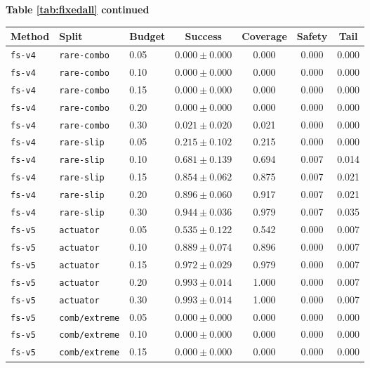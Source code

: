 \documentclass{article}
\begin{document}
\begin{center}
\textbf{Table \ref{tab:fixedall} continued}\\[0.4ex]
\begin{tabular}{lllcccc}
\toprule
Method & Split & Budget & Success & Coverage & Safety & Tail \\
\midrule
\texttt{fs-v4} & \texttt{rare-combo} & 0.05 & $0.000 \pm 0.000$ & 0.000 & 0.000 & 0.000 \\
\texttt{fs-v4} & \texttt{rare-combo} & 0.10 & $0.000 \pm 0.000$ & 0.000 & 0.000 & 0.000 \\
\texttt{fs-v4} & \texttt{rare-combo} & 0.15 & $0.000 \pm 0.000$ & 0.000 & 0.000 & 0.000 \\
\texttt{fs-v4} & \texttt{rare-combo} & 0.20 & $0.000 \pm 0.000$ & 0.000 & 0.000 & 0.000 \\
\texttt{fs-v4} & \texttt{rare-combo} & 0.30 & $0.021 \pm 0.020$ & 0.021 & 0.000 & 0.000 \\
\texttt{fs-v4} & \texttt{rare-slip} & 0.05 & $0.215 \pm 0.102$ & 0.215 & 0.000 & 0.000 \\
\texttt{fs-v4} & \texttt{rare-slip} & 0.10 & $0.681 \pm 0.139$ & 0.694 & 0.007 & 0.014 \\
\texttt{fs-v4} & \texttt{rare-slip} & 0.15 & $0.854 \pm 0.062$ & 0.875 & 0.007 & 0.021 \\
\texttt{fs-v4} & \texttt{rare-slip} & 0.20 & $0.896 \pm 0.060$ & 0.917 & 0.007 & 0.021 \\
\texttt{fs-v4} & \texttt{rare-slip} & 0.30 & $0.944 \pm 0.036$ & 0.979 & 0.007 & 0.035 \\
\texttt{fs-v5} & \texttt{actuator} & 0.05 & $0.535 \pm 0.122$ & 0.542 & 0.000 & 0.007 \\
\texttt{fs-v5} & \texttt{actuator} & 0.10 & $0.889 \pm 0.074$ & 0.896 & 0.000 & 0.007 \\
\texttt{fs-v5} & \texttt{actuator} & 0.15 & $0.972 \pm 0.029$ & 0.979 & 0.000 & 0.007 \\
\texttt{fs-v5} & \texttt{actuator} & 0.20 & $0.993 \pm 0.014$ & 1.000 & 0.000 & 0.007 \\
\texttt{fs-v5} & \texttt{actuator} & 0.30 & $0.993 \pm 0.014$ & 1.000 & 0.000 & 0.007 \\
\texttt{fs-v5} & \texttt{comb/extreme} & 0.05 & $0.000 \pm 0.000$ & 0.000 & 0.000 & 0.000 \\
\texttt{fs-v5} & \texttt{comb/extreme} & 0.10 & $0.000 \pm 0.000$ & 0.000 & 0.000 & 0.000 \\
\texttt{fs-v5} & \texttt{comb/extreme} & 0.15 & $0.000 \pm 0.000$ & 0.000 & 0.000 & 0.000 \\

\end{tabular}
\end{center}
\end{document}

